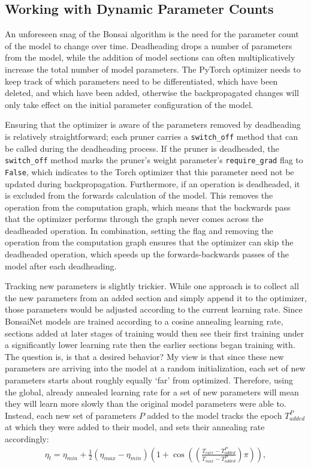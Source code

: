 \subsection{Working with Dynamic Parameter Counts}
An unforeseen snag of the Bonsai algorithm is the need for the parameter count of the model to change over time. Deadheading
drops a number of parameters from the model, while the addition of model sections can often multiplicatively increase the
total number of model parameters. The PyTorch optimizer needs to keep track of which parameters need to be differentiated,
which have been deleted, and which have been added, otherwise the backpropagated changes will only take effect on the
initial parameter configuration of the model.

Ensuring that the optimizer is aware of the parameters removed by deadheading is relatively straightforward; each pruner
carries a \texttt{switch\_off} method that can be called during the deadheading process. If the pruner is deadheaded,
the \texttt{switch\_off} method marks the pruner's weight parameter's \texttt{require\_grad} flag to \texttt{False}, which
indicates to the Torch optimizer that this parameter need not be updated during backpropagation. Furthermore, if an operation
is deadheaded, it is excluded from the forwards calculation of the model. This removes the operation from the computation
graph, which means that the backwards pass that the optimizer performs through the graph never comes across the deadheaded
operation. In combination, setting the flag and removing the operation from the computation graph ensures that the optimizer
can skip the deadheaded operation, which speeds up the forwards-backwards passes of the model after each deadheading.

Tracking new parameters is slightly trickier. While one approach is to collect all the new parameters from an added section and
simply append it to the optimizer, those parameters would be adjusted according to the current learning rate. Since
BonsaiNet models are trained according to a cosine annealing learning rate, sections added at later stages of
training would then see their first training under a significantly lower learning rate then the earlier sections
began training with. The question is, is that a desired behavior? My view is that since these new parameters are arriving into
the model at a random initialization, each set of new parameters starts about roughly equally `far' from optimized. Therefore,
using the global, already annealed learning rate for a set of new parameters will mean they will learn more slowly
than the original model parameters were able to. Instead, each new set of parameters $P$ added to the model tracks the
epoch $T^{P}_{added}$ at which they were added to their model, and sets their annealing rate accordingly:
\begin{align}
	\eta_t = \eta_{min} + \frac{1}{2}(\eta_{max}-\eta_{min})\left(1+ \cos \left(\left(\frac{T_{curr}-T^P_{added}}{T_{max}-T^P_{added}}\right) \pi \right)\right), \label{eq:tracked_annealing}
\end{align}

